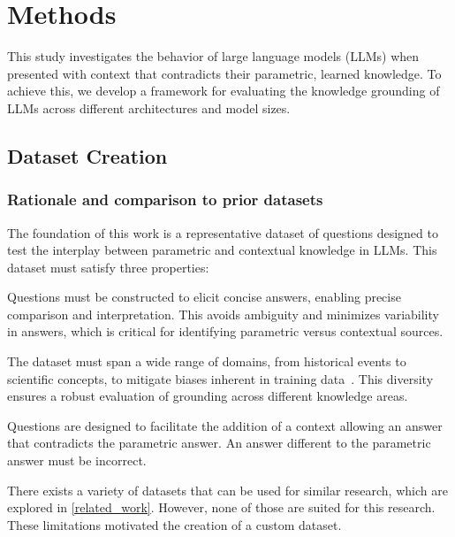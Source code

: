 \section{Methods}
\label{methodology_section}


This study investigates the behavior of large language models (LLMs) when presented with context that contradicts their parametric, learned knowledge.
To achieve this, we develop a framework for evaluating the knowledge grounding of LLMs across different architectures and model sizes.

\subsection{Dataset Creation}
\label{dataset_creation}

\subsubsection{Rationale and comparison to prior datasets}

The foundation of this work is a representative dataset of questions designed to test the interplay between parametric and contextual knowledge in LLMs.
This dataset must satisfy three properties:
\begin{description}[style=nextline]
	\item[1. Short, unambiguous answers] Questions must be constructed to elicit concise answers, enabling precise comparison and interpretation.
This avoids ambiguity and minimizes variability in answers, which is critical for identifying parametric versus contextual sources.
	\item[2. Coverage of diverse topics] The dataset must span a wide range of domains, from historical events to scientific concepts, to mitigate biases inherent in training data~\cite{wikipedia_geographic_bias}.
	This diversity ensures a robust evaluation of grounding across different knowledge areas.
	\item[3. Conterparametric compatibility] Questions are designed to facilitate the addition of a context allowing an answer that contradicts the parametric answer.
		An answer different to the parametric answer must be incorrect.
\end{description}

There exists a variety of datasets that can be used for similar research, which are explored in \cref{related_work}.
However, none of those are suited for this research.
These limitations motivated the creation of a custom dataset.

